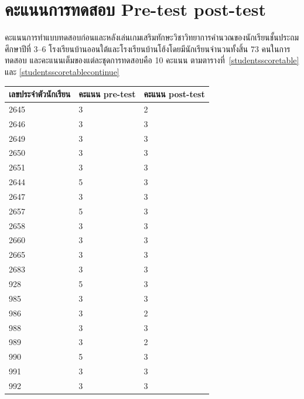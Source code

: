 \chapter{คะแนนการทดสอบ Pre-test post-test}
\label{kidsscore}
คะแนนการทำแบบทดสอบก่อนและหลังเล่นเกมเสริมทักษะวิชาวิทยาการคำนวณของนักเรียนชั้นประถม \newline 
ศึกษาปีที่ 3--6 โรงเรียนบ้านออนใต้และโรงเรียนบ้านโฮ้งโดยมีนักเรียนจำนวนทั้งสิ้น 73 คนในการทดสอบ
และคะแนนเต็มของแต่ละชุดการทดสอบคือ 10 คะแนน ตามตารางที่~\ref{studentsscoretable} และ \ref{studentsscoretablecontinue}
\begin{table}[h]
    \begin{center}
        \begin{tabular}{ |p{3cm}|p{2cm}|p{2cm}| }
            \hline
            เลขประจำตัวนักเรียน & คะแนน pre-test & คะแนน post-test\\
            \hline
            2645 & 3 & 2\\
            \hline
            2646 & 3 & 3\\
            \hline
            2649 & 3 & 3\\
            \hline
            2650 & 3 & 3\\
            \hline
            2651 & 3 & 3\\
            \hline
            2644 & 5 & 3\\
            \hline
            2647 & 3 & 3\\
            \hline
            2657 & 5 & 3\\
            \hline
            2658 & 3 &3\\
            \hline
            2660 & 3 & 3\\
            \hline
            2665 & 3 & 3\\
            \hline
            2683 & 3 & 3\\
            \hline
            928 & 5 & 3\\
            \hline
            985 & 3 & 3\\
            \hline
            986 & 3 & 2\\
            \hline
            988 & 3 & 3\\
            \hline
            989 & 3 & 2\\
            \hline
            990 & 5 & 3\\
            \hline
            991 & 3 & 3\\
            \hline
            992 & 3 & 3\\

\end{tabular}
\end{center}
\end{table}
